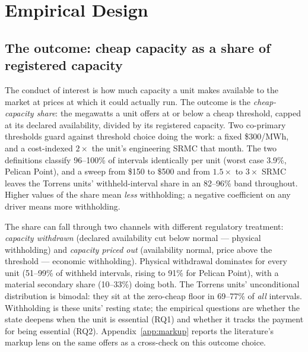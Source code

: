 \section{Empirical Design}\label{sec:design}

\subsection{The outcome: cheap capacity as a share of registered capacity}

The conduct of interest is how much capacity a unit makes available to the
market at prices at which it could actually run. The outcome is the
\emph{cheap-capacity share}: the megawatts a unit offers at or below a cheap
threshold, capped at its declared availability, divided by its registered
capacity. Two co-primary thresholds guard against threshold choice doing the
work: a fixed \$300/MWh, and a cost-indexed $2\times$ the unit's engineering
SRMC that month. The two definitions classify 96--100\% of intervals
identically per unit (worst case 3.9\%, Pelican Point), and a sweep from \$150
to \$500 and from $1.5\times$ to $3\times$ SRMC leaves the Torrens units'
withheld-interval share in an 82--96\% band throughout. Higher values of the
share mean \emph{less} withholding; a negative coefficient on any driver means
more withholding.

The share can fall through two channels with different regulatory treatment:
\emph{capacity withdrawn} (declared availability cut below normal --- physical
withholding) and \emph{capacity priced out} (availability normal, price above
the threshold --- economic withholding). Physical withdrawal dominates for
every unit (51--99\% of withheld intervals, rising to 91\% for Pelican Point),
with a material secondary share (10--33\%) doing both. The Torrens units'
unconditional distribution is bimodal: they sit at the zero-cheap floor in
69--77\% of \emph{all} intervals. Withholding is these units' resting state;
the empirical questions are whether the state deepens when the unit is
essential (RQ1) and whether it tracks the payment for being essential (RQ2).
Appendix~\ref{app:markup} reports the literature's markup lens on the same
offers as a cross-check on this outcome choice.

